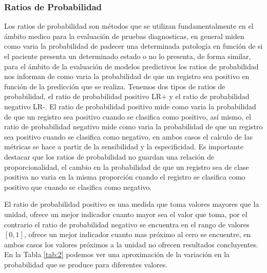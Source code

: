 \subsubsection{Ratios de Probabilidad}


Los ratios de probabilidad son métodos que se utilizan fundamentalmente en el ámbito medico para la evaluación de pruebas diagnosticas, en general miden como varia la probabilidad de padecer una determinada patología en función de si el paciente presenta un determinado estado o no lo presenta, de forma similar, para el ámbito de la evaluación de modelos predictivos los ratios de probabilidad nos informan de como varia la probabilidad de que un registro sea positivo en función de la predicción que se realiza.
\bigbreak
Tenemos dos tipos de ratios de probabilidad, el ratio de probabilidad positivo LR+ y el ratio de probabilidad negativo LR-. El ratio de probabilidad positivo mide como varia la probabilidad de que un registro sea positivo cuando se clasifica como positivo, así mismo, el ratio de probabilidad negativo mide como varia la probabilidad de que un registro sea positivo cuando se clasifica como negativo, en ambos casos el calculo de las métricas se hace a partir de la sensibilidad y la especificidad. Es importante destacar que los ratios de probabilidad no guardan una relación de proporcionalidad, el cambio en la probabilidad de que un registro sea de clase positiva no varia en la misma proporción cuando el registro se clasifica como positivo que cuando se clasifica como negativo.

\bigbreak
El ratio de probabilidad positivo es una medida que toma valores mayores que la unidad,  ofrece un mejor indicador cuanto mayor sea el valor que toma, por el contrario el ratio de probabilidad negativo se encuentra en el rango de valores $[0, 1]$, ofrece un mejor indicador cuanto mas próximo al cero se encuentre, en ambos casos los valores próximos a la unidad no ofrecen resultados concluyentes. En la Tabla \ref{tab:2} podemos ver una aproximación de la variación en la probabilidad que se produce para diferentes valores.
\bigbreak

